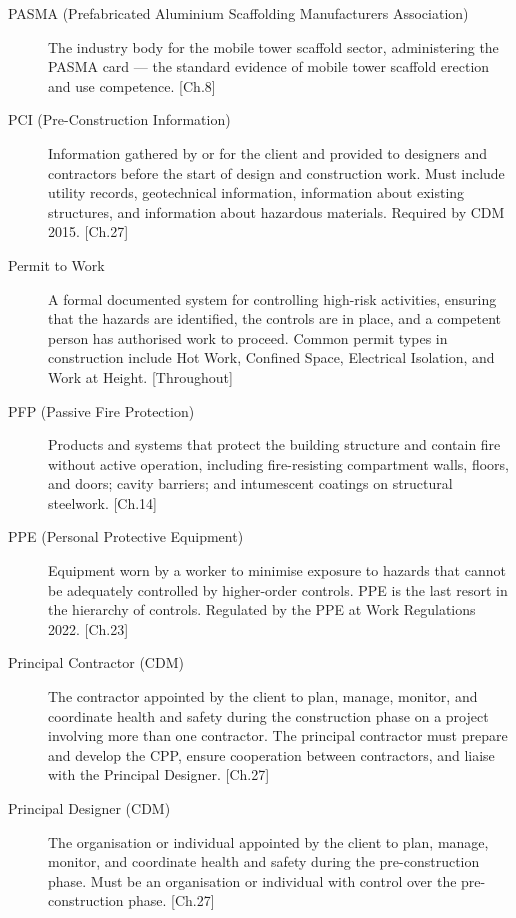 \begin{description}
\item[PASMA (Prefabricated Aluminium Scaffolding Manufacturers Association)] The industry body for the mobile tower scaffold sector, administering the PASMA card --- the standard evidence of mobile tower scaffold erection and use competence. [Ch.8]

\item[PCI (Pre-Construction Information)] Information gathered by or for the client and provided to designers and contractors before the start of design and construction work. Must include utility records, geotechnical information, information about existing structures, and information about hazardous materials. Required by CDM 2015. [Ch.27]

\item[Permit to Work] A formal documented system for controlling high-risk activities, ensuring that the hazards are identified, the controls are in place, and a competent person has authorised work to proceed. Common permit types in construction include Hot Work, Confined Space, Electrical Isolation, and Work at Height. [Throughout]

\item[PFP (Passive Fire Protection)] Products and systems that protect the building structure and contain fire without active operation, including fire-resisting compartment walls, floors, and doors; cavity barriers; and intumescent coatings on structural steelwork. [Ch.14]

\item[PPE (Personal Protective Equipment)] Equipment worn by a worker to minimise exposure to hazards that cannot be adequately controlled by higher-order controls. PPE is the last resort in the hierarchy of controls. Regulated by the PPE at Work Regulations 2022. [Ch.23]

\item[Principal Contractor (CDM)] The contractor appointed by the client to plan, manage, monitor, and coordinate health and safety during the construction phase on a project involving more than one contractor. The principal contractor must prepare and develop the CPP, ensure cooperation between contractors, and liaise with the Principal Designer. [Ch.27]

\item[Principal Designer (CDM)] The organisation or individual appointed by the client to plan, manage, monitor, and coordinate health and safety during the pre-construction phase. Must be an organisation or individual with control over the pre-construction phase. [Ch.27]


\end{description}
